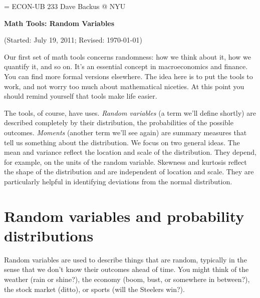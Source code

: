 \documentclass[11pt]{article}
\begin{document}
\parskip=\bigskipamount
\parindent=0.0in
\thispagestyle{empty}
{\large ECON-UB 233 \hfill Dave Backus @ NYU}

\bigskip\bigskip
\centerline{\Large \bf Math Tools:  Random Variables}
\centerline{(Started: July 19, 2011; Revised: \today)}

\bigskip
Our first set  of math tools concerns randomness:
how we think about it, how we quantify it, and so on.
It's an essential concept in macroeconomics and finance.
You can find more formal versions elsewhere.
The idea here is to put the tools to work,
and not worry too much about mathematical niceties.
At this point you should remind yourself that tools make life easier.

The tools, of course, have uses.
{\it Random variables\/} (a term we'll define shortly) 
are described completely by their distribution,
the probabilities of the possible outcomes.
{\it Moments\/} (another term we'll see again) are summary measures that tell us something about
the distribution.
We focus on two general ideas.
The mean and variance reflect the location and scale of the distribution.
They depend, for example, on the units of the random variable.
Skewness and kurtosis reflect the shape of the distribution
and are independent of location and scale.
They are particularly helpful in identifying
deviations from the normal distribution.


\section{Random variables and probability distributions}

Random variables are used to describe things that are random,
typically in the sense that we don't know their outcomes ahead of time.
You might think of the weather (rain or shine?),
the economy (boom, bust, or somewhere in between?),
the stock market (ditto),
or sports (will the Steelers win?).
\end{document}
